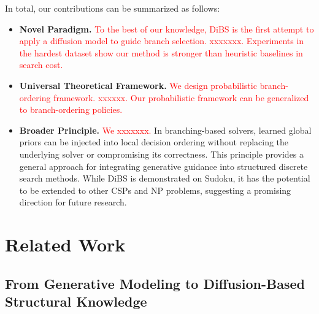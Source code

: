 \documentclass[lettersize,journal]{IEEEtran}
\newcommand{\hfj}[1]{\textcolor{red}{#1}}
\begin{document}
In total, our contributions can be summarized as follows:
\begin{itemize}
    \item \textbf{Novel Paradigm.} \hfj{To the best of our knowledge, DiBS is the first attempt to apply a diffusion model to guide branch selection. xxxxxxx. Experiments in the hardest dataset show our method is stronger than heuristic baselines in search cost.} %
    \item\textbf{Universal Theoretical Framework.} \hfj{We design probabilistic branch-ordering framework. xxxxxx. Our probabilistic framework can be generalized to branch-ordering policies.}
    \item \textbf{Broader Principle.} \hfj{We xxxxxxx.}
    In branching-based solvers, learned global priors can be injected into local decision ordering without replacing the underlying solver or compromising its correctness. This principle provides a general approach for integrating generative guidance into structured discrete search methods. While DiBS is demonstrated on Sudoku, it has the potential to be extended to other CSPs and NP problems, suggesting a promising direction for future research.
\end{itemize}

\section{Related Work}

\subsection{From Generative Modeling to Diffusion-Based Structural Knowledge}
\end{document}
